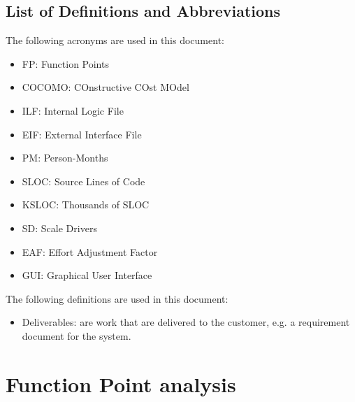 \documentclass[a4paper,11pt]{report} %
\begin{document}
		\subsection{List of Definitions and Abbreviations}
			The following acronyms are used in this document:
			\begin{itemize}
				\item FP: Function Points
				\item COCOMO: COnstructive COst MOdel
				\item ILF: Internal Logic File
				\item EIF: External Interface File
				\item PM: Person-Months
				\item SLOC: Source Lines of Code
				\item KSLOC: Thousands of SLOC
				\item SD: Scale Drivers
				\item EAF: Effort Adjustment Factor
				\item GUI: Graphical User Interface
			\end{itemize}
			The following definitions are used in this document:
			\begin{itemize}
				\item Deliverables: are work that are delivered to the customer, e.g. a requirement document for the system.
			\end{itemize}
	
	\pagebreak		
	\section{Function Point analysis}
\end{document}
